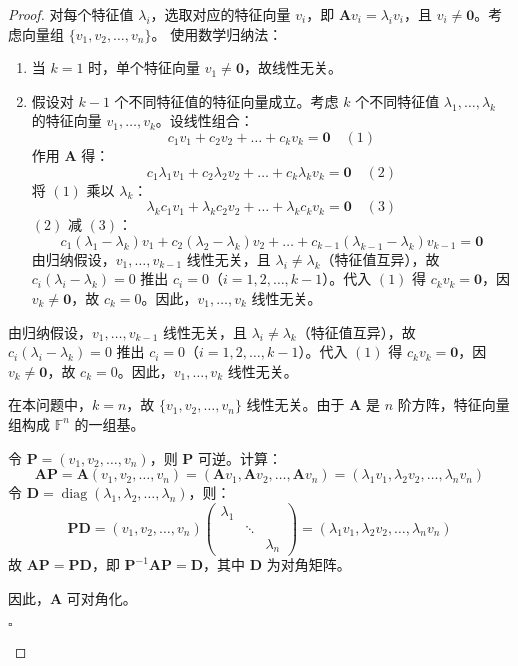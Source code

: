 \begin{proof}
	对每个特征值 $\lambda_i$，选取对应的特征向量 $v_i$，即 $\mathbf{A} v_i = \lambda_i v_i$，且 $v_i \neq \mathbf{0}$。考虑向量组 $\{v_1, v_2, \dots, v_n\}$。 使用数学归纳法：
	\begin{enumerate}
		\item 当 $k=1$ 时，单个特征向量 $v_1 \neq \mathbf{0}$，故线性无关。  
		\item 假设对 $k-1$ 个不同特征值的特征向量成立。考虑 $k$ 个不同特征值 $\lambda_1, \dots, \lambda_k$ 的特征向量 $v_1, \dots, v_k$。设线性组合：  
  $$
  c_1 v_1 + c_2 v_2 + \dots + c_k v_k = \mathbf{0} \quad (1)
  $$
  作用 $\mathbf{A}$ 得：  
  $$
  c_1 \lambda_1 v_1 + c_2 \lambda_2 v_2 + \dots + c_k \lambda_k v_k = \mathbf{0} \quad (2)
  $$
  将 $(1)$ 乘以 $\lambda_k$：  
  $$
  \lambda_k c_1 v_1 + \lambda_k c_2 v_2 + \dots + \lambda_k c_k v_k = \mathbf{0} \quad (3)
  $$
  $(2)$ 减 $(3)$：  
  $$
  c_1 (\lambda_1 - \lambda_k) v_1 + c_2 (\lambda_2 - \lambda_k) v_2 + \dots + c_{k-1} (\lambda_{k-1} - \lambda_k) v_{k-1} = \mathbf{0}
  $$
  由归纳假设，$v_1, \dots, v_{k-1}$ 线性无关，且 $\lambda_i \neq \lambda_k$（特征值互异），故 $c_i (\lambda_i - \lambda_k) = 0$ 推出 $c_i = 0$（$i=1,2,\dots,k-1$）。代入 $(1)$ 得 $c_k v_k = \mathbf{0}$，因 $v_k \neq \mathbf{0}$，故 $c_k = 0$。因此，$v_1, \dots, v_k$ 线性无关。
	\end{enumerate}
	由归纳假设，$v_1, \dots, v_{k-1}$ 线性无关，且 $\lambda_i \neq \lambda_k$（特征值互异），故 $c_i (\lambda_i - \lambda_k) = 0$ 推出 $c_i = 0$（$i=1,2,\dots,k-1$）。代入 $(1)$ 得 $c_k v_k = \mathbf{0}$，因 $v_k \neq \mathbf{0}$，故 $c_k = 0$。因此，$v_1, \dots, v_k$ 线性无关。

在本问题中，$k = n$，故 $\{v_1, v_2, \dots, v_n\}$ 线性无关。由于 $\mathbf{A}$ 是 $n$ 阶方阵，特征向量组构成 $\mathbb{F}^n$ 的一组基。

令 $\mathbf{P} = (v_1, v_2, \dots, v_n)$，则 $\mathbf{P}$ 可逆。计算：  
$$
\mathbf{A} \mathbf{P} = \mathbf{A} (v_1, v_2, \dots, v_n) = (\mathbf{A} v_1, \mathbf{A} v_2, \dots, \mathbf{A} v_n) = (\lambda_1 v_1, \lambda_2 v_2, \dots, \lambda_n v_n)
$$
令 $\mathbf{D} = \operatorname{diag}(\lambda_1, \lambda_2, \dots, \lambda_n)$，则：  
$$
\mathbf{P} \mathbf{D} = (v_1, v_2, \dots, v_n) \begin{pmatrix} \lambda_1 & & \\ & \ddots & \\ & & \lambda_n \end{pmatrix} = (\lambda_1 v_1, \lambda_2 v_2, \dots, \lambda_n v_n)
$$
故 $\mathbf{A} \mathbf{P} = \mathbf{P} \mathbf{D}$，即 $\mathbf{P}^{-1} \mathbf{A} \mathbf{P} = \mathbf{D}$，其中 $\mathbf{D}$ 为对角矩阵。

因此，$\mathbf{A}$ 可对角化。

\begin{flushright}
	$\square$
\end{flushright}
\end{proof}

